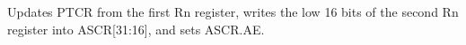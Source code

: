 Updates PTCR from the first Rn register, writes the low 16 bits of the second Rn register into ASCR[31:16], and sets ASCR.AE.
